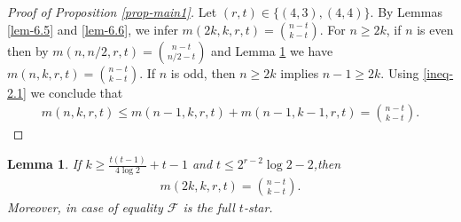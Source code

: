 \documentclass[11pt,a4paper]{article}
\newtheorem{lem}[thm]{Lemma}
\newtheorem{false statement}{False statement}
\theoremstyle{definition}
\def\hf{\mathcal{F}}
\begin{document}
\begin{proof}[Proof of Proposition \ref{prop-main1}]
Let $(r,t)\in \{(4,3),(4,4)\}$. By Lemmas \ref{lem-6.5} and \ref{lem-6.6}, we infer $m(2k,k,r,t)=\binom{n-t}{k-t}$.
For $n\geq 2k$, if $n$ is even then by $m(n,n/2,r,t)=\binom{n-t}{n/2-t}$ and  Lemma \ref{lem-6.3}  we have
$m(n,k,r,t)=\binom{n-t}{k-t}$.
If $n$ is odd, then $n\geq 2k$ implies $n-1\geq 2k$.
Using \eqref{ineq-2.1} we conclude that
\begin{align*}
m(n,k,r,t) \leq m(n-1,k,r,t) +m(n-1,k-1,r,t)  =\binom{n-t}{k-t}.
\end{align*}
\end{proof}


\begin{lem}\label{lem-6.3}
 If $k\geq  \frac{t(t-1)}{4\log 2} +t-1$ and  $t\leq 2^{r-2}\log 2 -2$,then
\begin{align}\label{ineq-5.3}
m(2k,k,r,t) =\binom{n-t}{k-t}.
\end{align}
Moreover, in case of equality $\hf$ is the full $t$-star.
\end{lem}
\end{document}
